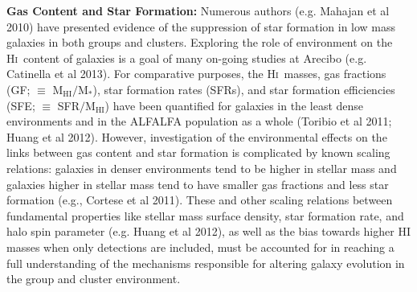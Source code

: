\documentclass[11pt]{article}
\newcommand{\HI}{H\textsc{i}}
\begin{document}
{\bf Gas Content and Star Formation:} \hskip 5pt Numerous authors
(e.g. Mahajan {et al} 2010) have presented evidence of the suppression of star
formation in low mass galaxies in both groups and clusters.
Exploring the role of environment on the \HI\ content of galaxies is a
goal of many on-going studies at Arecibo (e.g. Catinella {et al} 2013). For comparative purposes,
the \HI\ masses, gas fractions
(GF; $\equiv$ M$_\text{HI}/$M$_*$), star formation rates
(SFRs), and star formation efficiencies (SFE; $\equiv$ SFR$/$M$_\text{HI}$) have been
quantified for galaxies in the least dense environments and in the
ALFALFA population as a whole (Toribio {et al} 2011; Huang {et al} 2012).
However, investigation of the environmental effects on the links between gas content
and star formation is complicated by known scaling relations: galaxies in denser
environments tend to be higher in stellar mass and
galaxies higher in stellar mass tend to have smaller gas fractions and
less star formation (e.g., Cortese {et al} 2011). These and other
scaling relations between fundamental properties like
stellar mass surface density, star formation rate, and halo spin parameter
(e.g. Huang {et al} 2012), as well as the bias towards higher HI masses
when only detections are included,
must be accounted for in reaching a full
understanding of the mechanisms responsible for altering galaxy evolution
in the group and cluster environment.
\end{document}
